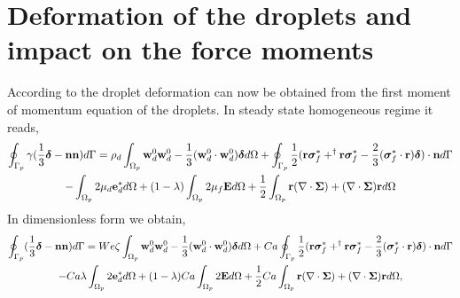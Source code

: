 
\section{Deformation of the droplets and impact on the force moments}
\label{sec:deformation}

According to \citet{fintzi2024averaged} the droplet deformation can now be obtained from the first moment of momentum equation of the droplets. 
In steady state homogeneous regime it reads, 
\begin{multline}
    \intS[p]{\gamma (\frac{1}{3}\bm\delta - \textbf{nn})}
    =
    \rho_d \intO[p]{
        \textbf{w}_d^0  \textbf{w}_d^0 
        -\frac{1}{3} (\textbf{w}_d^0 \cdot  \textbf{w}_d^0) \bm\delta
    }
    +\intS[p]{\frac{1}{2}(\textbf{r}\bm\sigma_f^*+^\dagger\textbf{r}\bm\sigma_f^*-\frac{2}{3}(\bm\sigma_f^* \cdot \textbf{r})\bm\delta)\cdot \textbf{n}}\nonumber\\
    - \intO[p]{2 \mu_d\textbf{e}_d^*} 
    + (1-\lambda)\intO[p]{2\mu_f\textbf{E}} 
    + \frac{1}{2}\intO[p]{\textbf{r}(\div\bm\Sigma)+ (\div\bm\Sigma) \textbf{r}}
\end{multline}
In dimensionless form we obtain, 
\begin{multline}
    \intS[p]{ (\frac{1}{3}\bm\delta - \textbf{nn})}
    =
    We \zeta\intO[p]{
        \textbf{w}_d^0  \textbf{w}_d^0 
        -\frac{1}{3} (\textbf{w}_d^0 \cdot  \textbf{w}_d^0) \bm\delta
    }
    +Ca \intS[p]{\frac{1}{2}(\textbf{r}\bm\sigma_f^*+^\dagger\textbf{r}\bm\sigma_f^*-\frac{2}{3}(\bm\sigma_f^* \cdot \textbf{r})\bm\delta)\cdot \textbf{n}}\\
    - Ca\lambda\intO[p]{2 \textbf{e}_d^*} 
    + (1-\lambda)Ca\intO[p]{2\textbf{E}} 
    + \frac{1}{2}Ca\intO[p]{\textbf{r}(\div\bm\Sigma)+ (\div\bm\Sigma) \textbf{r}},
    \label{eq:second_mom_steady_state}
\end{multline}
